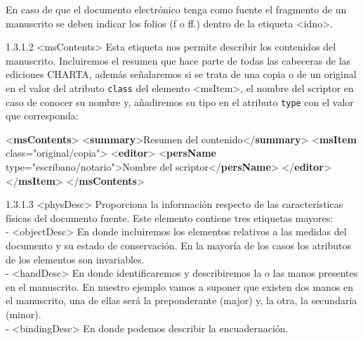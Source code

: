 \documentclass[
]{book}
\newenvironment{Shaded}{\begin{snugshade}}{\end{snugshade}}
\newcommand{\KeywordTok}[1]{\textcolor[rgb]{0.13,0.29,0.53}{\textbf{#1}}}
\newcommand{\NormalTok}[1]{#1}
\newcommand{\OtherTok}[1]{\textcolor[rgb]{0.56,0.35,0.01}{#1}}
\newcommand{\StringTok}[1]{\textcolor[rgb]{0.31,0.60,0.02}{#1}}
\begin{document}
En caso de que el documento electrónico tenga como fuente el fragmento de un manuscrito se deben indicar los folios (f o ff.) dentro de la etiqueta { \textless idno\textgreater{}}.

{1.3.1.2 } { \textless msContents\textgreater{} } Esta etiqueta nos permite describir los contenidos del manuscrito. Incluiremos el resumen que hace parte de todas las cabeceras de las ediciones CHARTA, además señalaremos si se trata de una copia o de un original en el valor del atributo \texttt{class} del elemento { \textless msItem\textgreater{}}, el nombre del scriptor en caso de conocer su nombre y, añadiremos su tipo en el atributo \texttt{type} con el valor que corresponda:

\begin{Shaded}
\begin{Highlighting}[]
\NormalTok{\textless{}}\KeywordTok{msContents}\NormalTok{\textgreater{} }
\NormalTok{  \textless{}}\KeywordTok{summary}\NormalTok{\textgreater{}Resumen del contenido\textless{}/}\KeywordTok{summary}\NormalTok{\textgreater{} }
\NormalTok{  \textless{}}\KeywordTok{msItem}\OtherTok{ class=}\StringTok{"original/copia"}\NormalTok{\textgreater{}}
\NormalTok{    \textless{}}\KeywordTok{editor}\NormalTok{\textgreater{}}
\NormalTok{      \textless{}}\KeywordTok{persName}\OtherTok{ type=}\StringTok{"escribano/notario"}\NormalTok{\textgreater{}Nombre del scriptor\textless{}/}\KeywordTok{persName}\NormalTok{\textgreater{} }
\NormalTok{    \textless{}/}\KeywordTok{editor}\NormalTok{\textgreater{}}
\NormalTok{  \textless{}/}\KeywordTok{msItem}\NormalTok{\textgreater{}}
\NormalTok{\textless{}/}\KeywordTok{msContents}\NormalTok{\textgreater{}}
\end{Highlighting}
\end{Shaded}

{1.3.1.3 } { \textless physDesc\textgreater{} }
Proporciona la información respecto de las características físicas del documento fuente. Este elemento contiene tres etiquetas mayores:\\
- { \textless objectDesc\textgreater{} } En donde incluiremos los elementos relativos a las medidas del documento y su estado de conservación. En la mayoría de los casos los atributos de los elementos son invariables.\\
- { \textless handDesc\textgreater{}} En donde identificaremos y describiremos la o las manos presentes en el manuscrito. En nuestro ejemplo vamos a suponer que existen dos manos en el manuscrito, una de ellas será la preponderante (major) y, la otra, la secundaria (minor).\\
- { \textless bindingDesc\textgreater{}} En donde podemos describir la encuadernación.
\end{document}
